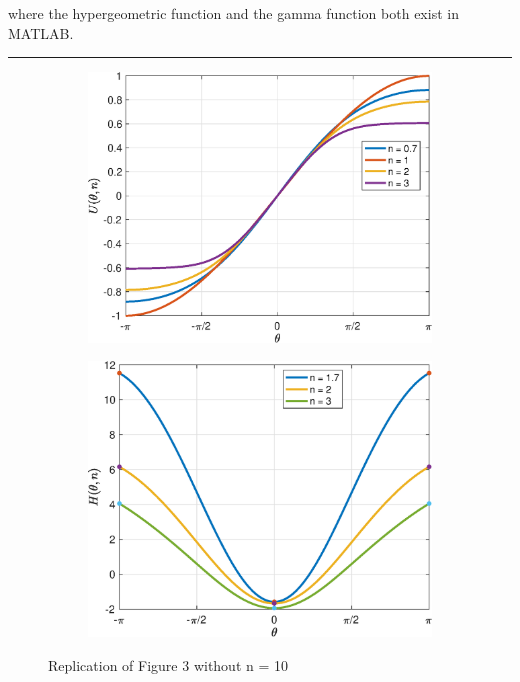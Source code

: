 \documentclass[12pt,3p]{article}
\numberwithin{equation}{section}
\begin{document}
where the hypergeometric function and the gamma function both exist in MATLAB. 
\noindent\rule{\linewidth}{0.5pt} %
\begin{figure}[h]
    \centering
    \begin{subfigure}[b]{0.45\textwidth}
        \includegraphics[width=\textwidth]{Fig3A.eps}
    \end{subfigure}
    \quad %
    \begin{subfigure}[b]{0.45\textwidth}
        \includegraphics[width=\textwidth]{Fig3B.eps}
    \end{subfigure}
    \caption{Replication of Figure 3 without n = 10}
\end{figure}
\end{document}
